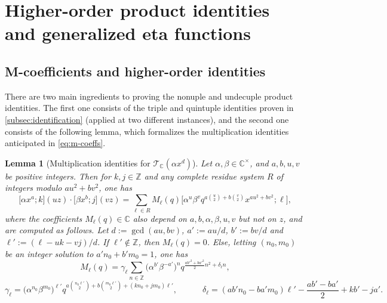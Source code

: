 \documentclass[reqno,11pt]{amsart}
\newtheorem{lemma}[theorem]{Lemma}
\theoremstyle{definition}
\theoremstyle{remark}
\numberwithin{equation}{section}
\newcommand{\Z}{\mathbb{Z}}
\newcommand{\C}{\mathbb{C}}
\newcommand{\mT}{\mathcal{T}}
\newcommand{\vect}[2]{\big[{#1};{#2}\big]}
\begin{document}
\section{Higher-order product identities and generalized eta functions} \label{sec:higher-prod-id}

\subsection{M-coefficients and higher-order identities}\label{subsec:higher-order}
There are two main ingredients to proving the nonuple and undecuple product identities. The first one consists of the triple and quintuple identities proven in \cref{subsec:identification} (applied at two different instances), and the second one consists of the following lemma, which formalizes the multiplication identities anticipated in \cref{eq:m-coeffs}.

\begin{lemma}[Multiplication identities for $\mT_\C(\alpha x^d)$] \label{lem:m-identities}
Let $\alpha, \beta \in \C^\times$, and $a, b, u, v$ be positive integers. Then for $k, j \in \Z$ and any complete residue system $R$ of integers modulo $au^2+bv^2$, one has
\begin{equation} \label{eq:m-expansion}
    \vect{\alpha x^a}{k}(u z) \cdot \vect{\beta x^b}{j}(v z) = 
    \sum_{\ell \in R} M_\ell(q) \vect{\alpha^u \beta^v q^{a\binom{u}{2} + b \binom{v}{2}} x^{au^2+bv^2}}{\ell},
\end{equation}
where the coefficients $M_\ell(q) \in \C$ also depend on $a, b, \alpha, \beta, u, v$ but not on $z$, and are computed as follows. Let $d := \gcd(au, bv)$, $a' := au/d$, $b' := bv/d$ and $\ell' := (\ell - uk - vj)/d$. If $\ell' \not\in \Z$, then $M_\ell(q) = 0$. Else, letting $(n_0, m_0)$ be an integer solution to $a'n_0 + b'm_0 = 1$, one has
\begin{equation} \label{eq:m-coeffs-formula}
    M_\ell(q)
    =
    \gamma_\ell \sum_{n \in \Z} 
    \big(\alpha^{b'} \beta^{-a'}\big)^n 
    q^{\frac{ab'^2 + ba'^2}{2}n^2 + \delta_\ell n},
\end{equation}
\[
    \gamma_\ell = \big( \alpha^{n_0} \beta^{m_0} \big)^{\ell'} q^{a\binom{n_0 \ell' }{2} + b\binom{m_0 \ell'}{2} + (kn_0 + jm_0)\ell'},
    \qquad\quad
    \delta_\ell 
    =
    (ab'n_0 - ba'm_0)\ell' - \frac{ab' - ba'}{2} + kb' - ja'.
\]
\end{lemma}
\end{document}
